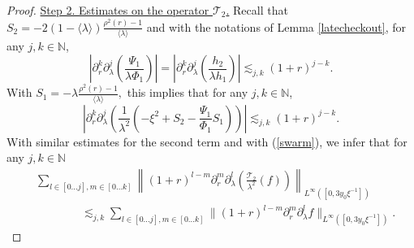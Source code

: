 \documentclass[11 pt]{amsart}
\theoremstyle{definition}
\theoremstyle{remark}
\numberwithin{equation}{section}
\begin{document}
\begin{proof}
\medskip
\noindent \underline{Step 2. Estimates on the operator $\mathcal{T}_2$.}
  Recall that $S_2 = - 2 (1 - \langle \lambda \rangle) \frac{\rho^2 (r) -
  1}{\langle \lambda \rangle}$ and with the notations of Lemma
  \ref{latecheckout}, for any $j, k \in \mathbb{N}$,
  \[ \left| \partial_r^k \partial_{\lambda}^j \left( \frac{\Psi_1}{\lambda
     \Phi_1} \right) \right| = \left| \partial_r^k \partial_{\lambda}^j \left(
     \frac{h_2}{\lambda h_1} \right) \right| \lesssim_{j, k} (1 + r)^{j - k} .
  \]
  With $S_1 = - \lambda \frac{\rho^2 (r) - 1}{\langle \lambda \rangle},$ this
  implies that for any $j, k \in \mathbb{N}$,
  \[ \left| \partial_r^k \partial_{\lambda}^j \left( \frac{1}{\lambda^2}
     \left( -\xi^2+S_2 - \frac{\Psi_1}{\Phi_1} S_1 \right) \right) \right|
     \lesssim_{j, k} (1 + r)^{j - k} . \]
  With similar estimates for the second term and with (\ref{swarm}), we infer
  that for any $j, k \in \mathbb{N}$
  \begin{align*}
& \sum_{l \in [0 \ldots j], m \in [0 \ldots k]} \left\| (1 + r)^{l - m
    } \partial_r^m \partial_{\lambda}^l \left(
    \frac{\mathcal{T}_2}{\lambda^2} (f) \right) \right\|_{L^{\infty} ([0, 3 y_0\xi^{- 1}])}\\
    & \qquad \qquad  \lesssim_{j, k}  \sum_{l \in [0 \ldots j], m \in [0 \ldots k]} \| (1 +
    r)^{l - m} \partial_r^m \partial_{\lambda}^l f \|_{L^{\infty} ([0, 3y_0
    \xi^{- 1}])} .
  \end{align*}
  

\end{proof}
\end{document}
